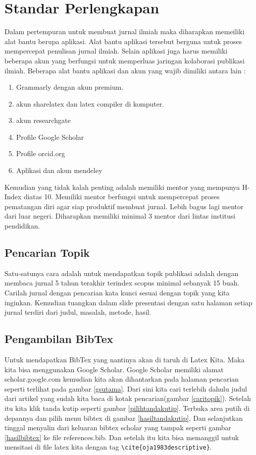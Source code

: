\chapter{Standar Perlengkapan}

Dalam pertempuran untuk membuat jurnal ilmiah maka diharapkan memeiliki alat bantu berupa aplikasi. Alat bantu aplikasi tersebut berguna untuk proses mempercepat penulisan jurnal ilmiah. Selain aplikasi juga harus memiliki beberapa akun yang berfungsi untuk memperluas jaringan kolaborasi publikasi ilmiah. Beberapa alat bantu aplikasi dan akun yang wajib dimiliki antara lain :
\begin{enumerate}
\item Grammarly dengan akun premium.
\item akun sharelatex dan latex compiler di komputer.
\item akun researchgate
\item Profile Google Scholar
\item Profile orcid.org
\item Aplikasi dan akun mendeley
\end{enumerate}
Kemudian yang tidak kalah penting adalah memiliki mentor yang mempunya H-Index diatas 10. Memiliki mentor berfungsi untuk mempercepat proses pematangan diri agar siap produktif membuat jurnal. Lebih bagus lagi mentor dari luar negeri. Diharapkan memiliki minimal 3 mentor dari lintas institusi pendidikan.

\section{Pencarian Topik}
Satu-satunya cara adalah untuk mendapatkan topik publikasi adalah dengan membaca jurnal 5 tahun terakhir terindex scopus minimal sebanyak 15 buah. Carilah jurnal dengan pencarian  kata kunci sesuai dengan topik yang kita inginkan. Kemudian tuangkan dalam slide presentasi dengan satu halaman setiap jurnal terdiri dari judul, masalah, metode, hasil.

\section{Pengambilan BibTex}
Untuk mendapatkan BibTex yang nantinya akan di taruh di Latex Kita. Maka kita bisa menggunakan Google Scholar. Google Scholar memiliki alamat scholar.google.com kemudian kita akan dihantarkan pada halaman pencarian seperti terlihat pada gambar \ref{gsutama}. Dari sini kita cari terlebih dahulu judul dari artikel yang sudah kita baca di kotak pencarian(gambar \ref{caritopik}). Setelah itu kita klik tanda kutip seperti gambar \ref{pilihtandakutip}. Terbuka area putih di depannya dan pilih menu bibtex di gambar \ref{hasiltandakutip}. Dan selanjutkan tinggal menyalin dari keluaran bibtex scholar yang tampak seperti gambar \ref{hasilbibtex} ke file references.bib. Dan setelah itu kita bisa memanggil untuk mensitasi di file latex kita dengan tag \verb|\cite{oja1983descriptive}|.

